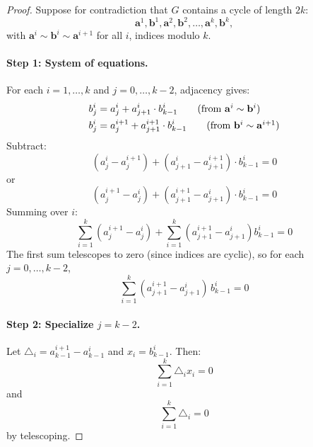\documentclass[a4paper]{article}
\begin{document}
\begin{proof}
        Suppose for contradiction that $G$ contains a cycle of length $2k$:
        \[
            \mathbf{a}^1, \mathbf{b}^1, \mathbf{a}^2, \mathbf{b}^2, \ldots, \mathbf{a}^k, \mathbf{b}^k,
        \]
        with $\mathbf{a}^i \sim \mathbf{b}^i \sim \mathbf{a}^{i+1}$ for all $i$, indices modulo $k$.

        \paragraph{Step 1: System of equations.}
        For each $i=1,\ldots,k$ and $j = 0, \ldots, k-2$, adjacency gives:
        \begin{align}
            b_j^i &= a_j^i + a_{j+1}^i \cdot b_{k-1}^i \tag{from $\mathbf{a}^i \sim \mathbf{b}^i$} \\
            b_j^i &= a_j^{i+1} + a_{j+1}^{i+1} \cdot b_{k-1}^i \tag{from $\mathbf{b}^i \sim \mathbf{a}^{i+1}$}
        \end{align}
        Subtract:
        \[
            (a_j^i - a_j^{i+1}) + (a_{j+1}^i - a_{j+1}^{i+1}) \cdot b_{k-1}^i = 0
        \]
        or
        \[
            (a_j^{i+1} - a_j^i) + (a_{j+1}^{i+1} - a_{j+1}^i) \cdot b_{k-1}^i = 0
        \]
        Summing over $i$:
        \[
            \sum_{i=1}^k (a_j^{i+1} - a_j^i) + \sum_{i=1}^k (a_{j+1}^{i+1} - a_{j+1}^i) b_{k-1}^i = 0
        \]
        The first sum telescopes to zero (since indices are cyclic), so for each $j=0,\ldots,k-2$,
        \begin{equation} \label{eq:main}
            \sum_{i=1}^k (a_{j+1}^{i+1} - a_{j+1}^i)\, b_{k-1}^i = 0
        \end{equation}

        \paragraph{Step 2: Specialize $j = k-2$.}
        Let $\triangle_i = a_{k-1}^{i+1} - a_{k-1}^i$ and $x_i = b_{k-1}^i$. Then:
        \[
            \sum_{i=1}^k \triangle_i x_i = 0
        \]
        and
        \[
            \sum_{i=1}^k \triangle_i = 0
        \]
        by telescoping.


\end{proof}
\end{document}
